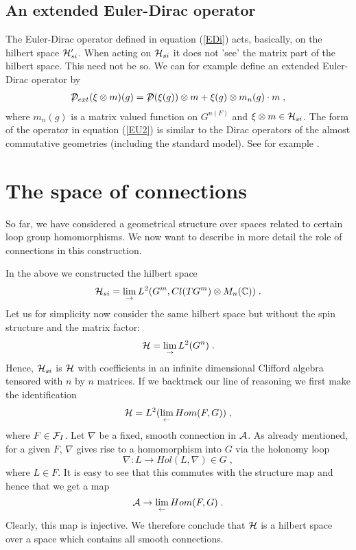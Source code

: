 \documentclass[12pt]{article}
\newcommand{\ba}{\begin{eqnarray}}
\newcommand{\ea}{\end{eqnarray}}
\def\ca{{\cal A}}
\def\cd{{\cal D}}
\def\cf{{\cal F}}
\def\ch{{\cal H}}
\newcommand{\bbC}{{\Bbb C}}
\begin{document}
\subsection{An extended Euler-Dirac operator}

The Euler-Dirac operator defined in equation (\ref{EDi}) acts, basically, on the hilbert
space $\ch'_{si}$. When acting on $\ch_{si}$ it does not 'see' the matrix
part of the hilbert space. This need not be so. We can for example define an extended
Euler-Dirac operator by
\ba
\displaystyle{\not} \cd_{ext}(\xi \otimes m) (g) = \displaystyle{\not} \cd
(\xi (g))\otimes m + \xi (g)\otimes m_n(g)\cdot m\;,
\label{EU2}
\ea
where $m_n(g)$ is a matrix valued function on $G^{n(F)}$ and $\xi\otimes m \in
\ch_{si}$. The form of the operator in equation (\ref{EU2}) is similar to the Dirac operators of the almost commutative
geometries (including the standard model). See for example \cite{Connes:1996gi}.








\section{The space of connections}
\label{section-connection}


So far, we have considered a geometrical structure over spaces related to
certain loop group homomorphisms. We now want to describe in more detail the role of
connections in this construction.

In the above we constructed the hilbert space 
\[
\ch_{si} = \lim_{\rightarrow} L^2 (G^{m},Cl(TG^{m})\otimes M_{n}(\bbC))\;.
\]
Let us for simplicity now consider the same hilbert space but without the spin
structure and the matrix factor:
\[
\ch = \lim_{\rightarrow} L^2(G^n)\;.
\]
Hence, $\ch_{si}$ is $\ch$ with coefficients in an infinite dimensional
Clifford algebra tensored with $n$ by $n$ matrices. If we backtrack our line of reasoning we
first make the identification
\[
\ch = L^2(\lim_{\leftarrow} Hom(F,G))\;,
\]
where $F\in\cf_I$. Let $\nabla$ be a fixed, smooth connection in $\ca$. As already
mentioned, for a
given $F$, $\nabla$ gives rise to a homomorphism into $G$ via the holonomy
loop 
\[
\nabla: L \rightarrow Hol(L,\nabla)\in G\;,
\]
where $L\in F$. It is easy to see that this commutes with the structure map
and hence that we get a map
\[
\ca \to \lim_{\leftarrow} Hom(F,G)\;.
\]
Clearly, this map is injective. We therefore conclude that $\ch$
is a hilbert space over a space which contains all smooth connections. 
\end{document}
